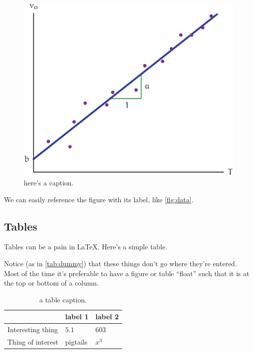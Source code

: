 \documentclass[10pt,twocolumn]{article}
\begin{document}
\begin{figure}[bt]
	\centering
	\includegraphics[width=.9\linewidth]{figures/data.pdf}
	\caption{here's a caption.}
	\label{fig:data}
\end{figure}

We can easily reference the figure with its label, like \autoref{fig:data}.

\subsection{Tables}
Tables can be a pain in \LaTeX{}. Here's a simple table.

Notice (as in \autoref{tab:dummy}) that these things don't go where they're entered. Most of the time it's preferable to have a figure or table ``float'' such that it is at the top or bottom of a column.
 
\begin{table}[bt]
	\begin{tabularx}{1\linewidth}{ lXX }
		\hline
		 & \textbf{label 1} & \textbf{label 2} \\
		\hline
		Interesting thing & $5.1$ & $603$ \\
		Thing of interest & pigtails & $x^3$ \\
		\hline
	\end{tabularx}
	\caption{a table caption.}
	\label{tab:dummy}
\end{table}
\end{document}
